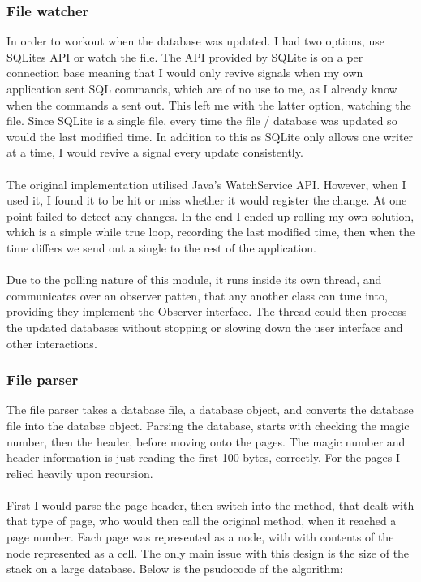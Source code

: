 \subsubsection{File watcher}
\label{subsubsec:file_watcher_imp}

In order to workout when the database was updated. I had two options, use SQLites API or watch the file. The API provided by SQLite is on a per connection base meaning that I would only revive signals when my own application sent SQL commands, which are of no use to me, as  I already know when the commands a sent out. This left me with the latter option, watching the file. Since SQLite is a single file, every time the file / database was updated so would the last modified time. In addition to this as SQLite only allows one writer at a time, I would revive a signal every update consistently.  
\\\\
The original implementation utilised Java's WatchService API. However, when I used it, I found it to be hit or miss whether it would register the change. At one point failed to detect any changes. In the end I ended up rolling my own solution, which is a simple while true loop, recording the last modified time, then when the time differs we send out a single to the rest of the application. 
\\\\
Due to the polling nature of this module, it runs inside its own thread, and communicates over an observer patten, that any another class can tune into, providing they implement the Observer interface. The thread could then process the updated databases without stopping or slowing down the user interface and other interactions.

\subsubsection{File parser}
\label{subsubsec:file_parser_imp}

The file parser takes a database file, a database object, and converts the database file into the databse object. Parsing the database, starts with checking the magic number, then the header, before moving onto the pages. The magic number and header information is just reading the first 100 bytes, correctly. For the pages I relied heavily upon recursion.
\\\\
First I would parse the page header, then switch into the method, that dealt with that type of page, who would then call the original method, when it reached a page number.  Each page was represented as a node, with with contents of the node represented as a cell. The only main issue with this design is the size of the stack on a large database. Below is the psudocode of the algorithm:

